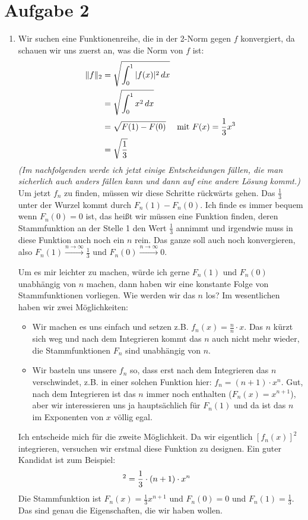 \documentclass{article}
\begin{document}
	\section*{Aufgabe 2}
	\begin{enumerate}[label=(\alph*)]
		\item Wir suchen eine Funktionenreihe, die in der 2-Norm gegen $f$ konvergiert, da schauen wir uns zuerst an, was die Norm von $f$ ist:
		\begin{align}
			\Vert f\Vert_2 &= \sqrt{\int_0^1 \vert f(x)\vert^2 \,dx} \notag \\
			&= \sqrt{\int_0^1 x^2\,dx} \notag \\
			&= \sqrt{F(1) - F(0)} \quad\text{ mit } F(x) = \frac{1}{3}x^3 \notag \\
			&= \sqrt{\frac{1}{3}} \notag
		\end{align}
		\textit{(Im nachfolgenden werde ich jetzt einige Entscheidungen fällen, die man sicherlich auch anders fällen kann und dann auf eine andere Lösung kommt.)} Um jetzt $f_n$ zu finden, müssen wir diese Schritte rückwärts gehen. Das $\frac{1}{3}$ unter der Wurzel kommt durch $F_n(1) - F_n(0)$. Ich finde es immer bequem wenn $F_n(0)=0$ ist, das heißt wir müssen eine Funktion finden, deren Stammfunktion an der Stelle 1 den Wert $\frac{1}{3}$ annimmt und irgendwie muss in diese Funktion auch noch ein $n$ rein. Das ganze soll auch noch konvergieren, also $F_n(1) \xrightarrow{n\to\infty} \frac{1}{3}$ und $F_n(0) \xrightarrow{n\to\infty} 0$.
		
		Um es mir leichter zu machen, würde ich gerne $F_n(1)$ und $F_n(0)$ unabhängig von $n$ machen, dann haben wir eine konstante Folge von Stammfunktionen vorliegen. Wie werden wir das $n$ los? Im wesentlichen haben wir zwei Möglichkeiten:
		\begin{itemize}
			\item Wir machen es uns einfach und setzen z.B. $f_n(x) = \frac{n}{n}\cdot x$. Das $n$ kürzt sich weg und nach dem Integrieren kommt das $n$ auch nicht mehr wieder, die Stammfunktionen $F_n$ sind unabhängig von $n$.
			\item Wir basteln uns unsere $f_n$ so, dass erst nach dem Integrieren das $n$ verschwindet, z.B. in einer solchen Funktion hier: $f_n = (n+1)\cdot x^n$. Gut, nach dem Integrieren ist das $n$ immer noch enthalten ($F_n(x) = x^{n+1}$), aber wir interessieren uns ja hauptsächlich für $F_n(1)$ und da ist das $n$ im Exponenten von $x$ völlig egal.
		\end{itemize}
		Ich entscheide mich für die zweite Möglichkeit. Da wir eigentlich $[f_n(x)]^2$ integrieren, versuchen wir erstmal diese Funktion zu designen. Ein guter Kandidat ist zum Beispiel:
		\begin{align}
			[f_n(x)]^2 &= \frac{1}{3}\cdot (n+1)\cdot x^n \notag
		\end{align}
		Die Stammfunktion ist $F_n(x) = \frac{1}{3} x^{n+1}$ und $F_n(0)=0$ und $F_n(1) = \frac{1}{3}$. Das sind genau die Eigenschaften, die wir haben wollen.
		

\end{enumerate}
\end{document}
